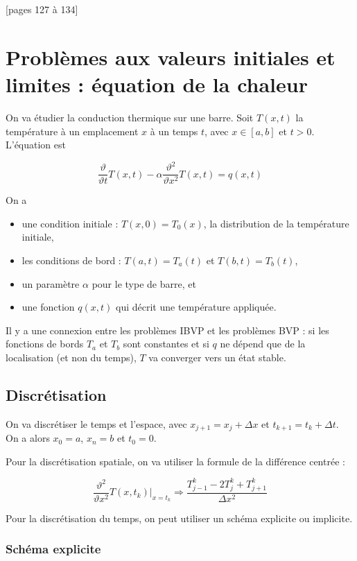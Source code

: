 [pages 127 à 134]
		 
\section{Problèmes aux valeurs initiales et limites : équation de la chaleur}

On va étudier la conduction thermique sur une barre. Soit $T(x, t)$ la température à un emplacement $x$ à un temps $t$, avec $x \in [a, b]$ et $t > 0$. L'équation est

$$\frac{\vartheta}{\vartheta t} T(x, t) - \alpha \frac{\vartheta^2}{\vartheta x^2} T(x, t) = q(x, t)$$

On a

\begin{itemize}
	\item une condition initiale : $T(x, 0) = T_0(x)$, la distribution de la température initiale,
	\item les conditions de bord : $T(a, t) = T_a(t)$ et $T(b, t) = T_b(t)$,
	\item un paramètre $\alpha$ pour le type de barre, et
	\item une fonction $q(x, t)$ qui décrit une température appliquée.
\end{itemize}

Il y a une connexion entre les problèmes IBVP et les problèmes BVP : si les fonctions de bords $T_a$ et $T_b$ sont constantes et si $q$ ne dépend que de la localisation (et non du temps), $T$ va converger vers un état stable.

	\subsection{Discrétisation}
	
	On va discrétiser le temps et l'espace, avec $x_{j + 1} = x_j + \Delta x$ et $t_{k + 1} = t_k + \Delta t$. On a alors $x_0 = a$, $x_n = b$ et $t_0 = 0$.
	
	Pour la discrétisation spatiale, on va utiliser la formule de la différence centrée :
	
	$$\frac{\vartheta^2}{\vartheta x^2}T(x, t_k) \vert_{x = t_k} \Rightarrow \frac{T_{j - 1}^k - 2T_j^k + T^k_{j + 1}}{\Delta x^2}$$
	
	Pour la discrétisation du temps, on peut utiliser un schéma explicite ou implicite.
	
		\subsubsection{Schéma explicite}
		
